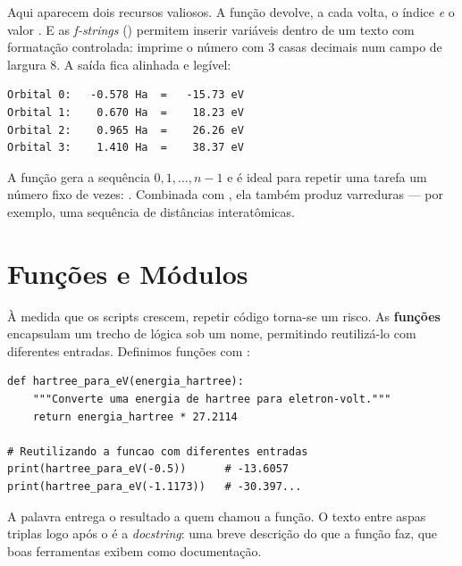 \noindent
Aqui aparecem dois recursos valiosos. A função  devolve, a cada
volta, o índice  \emph{e} o valor . E as \emph{f-strings}
() permitem inserir variáveis dentro de um texto com formatação
controlada:  imprime o número com 3 casas decimais num campo de
largura 8. A saída fica alinhada e legível:

\begin{lstlisting}[style=console]
Orbital 0:   -0.578 Ha  =   -15.73 eV
Orbital 1:    0.670 Ha  =    18.23 eV
Orbital 2:    0.965 Ha  =    26.26 eV
Orbital 3:    1.410 Ha  =    38.37 eV
\end{lstlisting}

\begin{caixadica}
A função  gera a sequência $0, 1, \dots, n-1$ e é ideal para repetir
uma tarefa um número fixo de vezes: . Combinada com
, ela também produz varreduras --- por exemplo, uma
sequência de distâncias interatômicas.
\end{caixadica}

\section{Funções e Módulos}
\label{sec:funcoes}

À medida que os scripts crescem, repetir código torna-se um risco. As
\textbf{funções} encapsulam um trecho de lógica sob um nome, permitindo reutilizá-lo
com diferentes entradas. Definimos funções com :

\begin{lstlisting}[style=python,caption={Uma função para converter energias.},label={lst:funcao}]
def hartree_para_eV(energia_hartree):
    """Converte uma energia de hartree para eletron-volt."""
    return energia_hartree * 27.2114

# Reutilizando a funcao com diferentes entradas
print(hartree_para_eV(-0.5))      # -13.6057
print(hartree_para_eV(-1.1173))   # -30.397...
\end{lstlisting}

\noindent
A palavra  entrega o resultado a quem chamou a função. O texto entre
aspas triplas logo após o  é a \emph{docstring}: uma breve descrição do
que a função faz, que boas ferramentas exibem como documentação.

